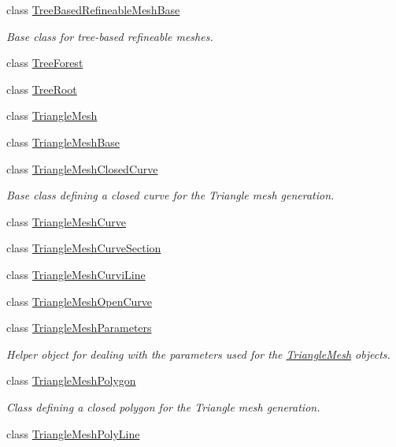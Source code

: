 \begin{DoxyCompactItemize}
\item 
class \hyperlink{classoomph_1_1TreeBasedRefineableMeshBase}{Tree\+Based\+Refineable\+Mesh\+Base}
\begin{DoxyCompactList}\small\item\em Base class for tree-\/based refineable meshes. \end{DoxyCompactList}\item 
class \hyperlink{classoomph_1_1TreeForest}{Tree\+Forest}
\item 
class \hyperlink{classoomph_1_1TreeRoot}{Tree\+Root}
\item 
class \hyperlink{classoomph_1_1TriangleMesh}{Triangle\+Mesh}
\item 
class \hyperlink{classoomph_1_1TriangleMeshBase}{Triangle\+Mesh\+Base}
\item 
class \hyperlink{classoomph_1_1TriangleMeshClosedCurve}{Triangle\+Mesh\+Closed\+Curve}
\begin{DoxyCompactList}\small\item\em Base class defining a closed curve for the Triangle mesh generation. \end{DoxyCompactList}\item 
class \hyperlink{classoomph_1_1TriangleMeshCurve}{Triangle\+Mesh\+Curve}
\item 
class \hyperlink{classoomph_1_1TriangleMeshCurveSection}{Triangle\+Mesh\+Curve\+Section}
\item 
class \hyperlink{classoomph_1_1TriangleMeshCurviLine}{Triangle\+Mesh\+Curvi\+Line}
\item 
class \hyperlink{classoomph_1_1TriangleMeshOpenCurve}{Triangle\+Mesh\+Open\+Curve}
\item 
class \hyperlink{classoomph_1_1TriangleMeshParameters}{Triangle\+Mesh\+Parameters}
\begin{DoxyCompactList}\small\item\em Helper object for dealing with the parameters used for the \hyperlink{classoomph_1_1TriangleMesh}{Triangle\+Mesh} objects. \end{DoxyCompactList}\item 
class \hyperlink{classoomph_1_1TriangleMeshPolygon}{Triangle\+Mesh\+Polygon}
\begin{DoxyCompactList}\small\item\em Class defining a closed polygon for the Triangle mesh generation. \end{DoxyCompactList}\item 
class \hyperlink{classoomph_1_1TriangleMeshPolyLine}{Triangle\+Mesh\+Poly\+Line}

\end{DoxyCompactItemize}
